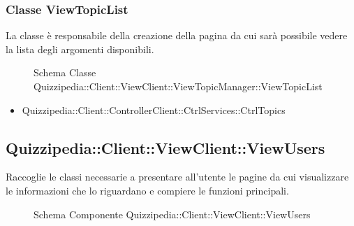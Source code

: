 \subsubsection{Classe ViewTopicList}
La classe è responsabile della creazione della pagina da cui sarà possibile vedere la lista degli argomenti disponibili.
\begin{figure}[H]
\centering
\noindent{}
\caption{Schema Classe Quizzipedia::Client::ViewClient::ViewTopicManager::ViewTopicList}
\end{figure}
\begin{itemize}
\item Quizzipedia::Client::ControllerClient::CtrlServices::CtrlTopics
\end{itemize}
\subsection{Quizzipedia::Client::ViewClient::ViewUsers}
Raccoglie le classi necessarie a presentare all'utente le pagine da cui visualizzare le informazioni che lo riguardano e compiere le funzioni principali.
\begin{figure}[H]
\centering
\noindent{}
\caption[Quizzipedia::Client::ViewClient::ViewUsers]{Schema Componente Quizzipedia::Client::ViewClient::ViewUsers}
\end{figure}
